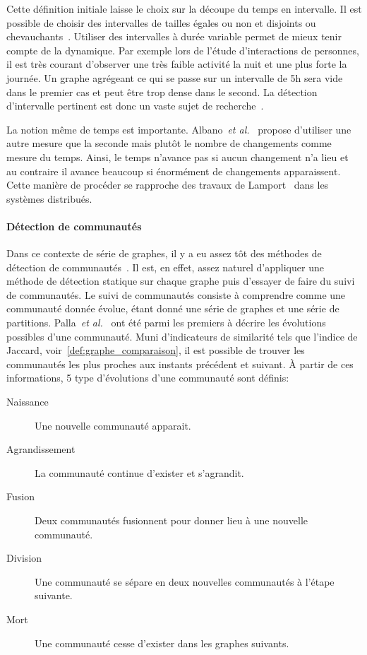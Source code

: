 Cette définition initiale laisse le choix sur la découpe du temps en intervalle.
Il est possible de choisir des intervalles de tailles égales ou non et disjoints ou chevauchants~\cite{Wang2012}.
Utiliser des intervalles à durée variable permet de mieux tenir compte de la dynamique.
Par exemple lors de l'étude d'interactions de personnes, il est très courant d'observer une très faible activité la nuit et une plus forte la journée.
Un graphe agrégeant ce qui se passe sur un intervalle de 5h sera vide dans le premier cas et peut être trop dense dans le second.
La détection d'intervalle pertinent est donc un vaste sujet de recherche~\cite{Rosvall2010,Krings2012,Ribeiro2013,Caceres2013,Peel2015,de2016detection}.

La notion même de temps est importante.
Albano~\emph{et al.}~\cite{Albano2014} propose d'utiliser une autre mesure que la seconde mais plutôt le nombre de changements comme mesure du temps.
Ainsi, le temps n'avance pas si aucun changement n'a lieu et au contraire il avance beaucoup si énormément de changements apparaissent.
Cette manière de procéder se rapproche des travaux de Lamport~\cite{Lamport1978} dans les systèmes distribués.

\paragraph{Détection de communautés}
Dans ce contexte de série de graphes, il y a eu assez tôt des méthodes de détection de communautés~\cite{Hopcroft2004,Sun2007,Lin2008,Asur2009}.
Il est, en effet, assez naturel d'appliquer une méthode de détection statique sur chaque graphe puis d'essayer de faire du suivi de communautés.
Le suivi de communautés consiste à comprendre comme une communauté donnée évolue, étant donné une série de graphes et une série de partitions.
Palla~\emph{et al.}~\cite{Palla2007} ont été parmi les premiers à décrire les évolutions possibles d'une communauté.
Muni d'indicateurs de similarité tels que l'indice de Jaccard, voir~\ref{def:graphe_comparaison}, il est possible de trouver les communautés les plus proches aux instants précédent et suivant.
\`A partir de ces informations, 5 type d'évolutions d'une communauté sont définis:
\begin{description}
\item[Naissance] Une nouvelle communauté apparait.
\item[Agrandissement] La communauté continue d'exister et s'agrandit.
\item[Fusion] Deux communautés fusionnent pour donner lieu à une nouvelle communauté.
\item[Division] Une communauté se sépare en deux nouvelles communautés à l'étape suivante.
\item[Mort] Une communauté cesse d'exister dans les graphes suivants.
\end{description}

